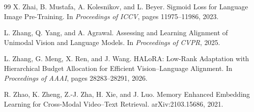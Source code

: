 \documentclass[11pt,a4paper]{article}
\begin{document}
\begin{thebibliography}{99}
X. Zhai, B. Mustafa, A. Kolesnikov, and L. Beyer.
\newblock Sigmoid Loss for Language Image Pre-Training.
\newblock In \emph{Proceedings of ICCV}, pages 11975--11986, 2023.

L. Zhang, Q. Yang, and A. Agrawal.
\newblock Assessing and Learning Alignment of Unimodal Vision and Language Models.
\newblock In \emph{Proceedings of CVPR}, 2025.

L. Zhang, G. Meng, X. Ren, and J. Wang.
\newblock HALoRA: Low-Rank Adaptation with Hierarchical Budget Allocation for
Efficient Vision--Language Alignment.
\newblock In \emph{Proceedings of AAAI}, pages 28283--28291, 2026.

R. Zhao, K. Zheng, Z.-J. Zha, H. Xie, and J. Luo.
\newblock Memory Enhanced Embedding Learning for Cross-Modal Video--Text Retrieval.
\newblock arXiv:2103.15686, 2021.

\end{thebibliography}
\end{document}
